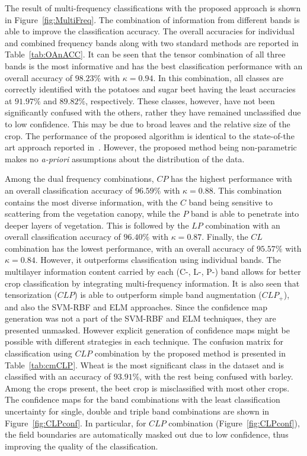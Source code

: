 The result of multi-frequency classifications with the proposed approach is shown in Figure~\ref{fig:MultiFreq}. The combination of information from different bands is able to improve the classification accuracy. The overall accuracies for individual and combined frequency bands along with two standard methods are reported in Table~\ref{tab:OAnACC}. 
It can be seen that the tensor combination of all three bands is the most informative and has the best classification performance with an overall accuracy of $98.23\%$ with $\kappa = 0.94$. In this combination, all classes are correctly identified with the potatoes and sugar beet having the least accuracies at $91.97\%$ and $89.82\%$, respectively. These classes, however, have not been significantly confused with the others, rather they have remained unclassified due to low confidence. This may be due to broad leaves and the relative size of the crop.
%
The performance of the proposed algorithm is identical to the state-of-the art approach reported in~\cite{7375754}. However, the proposed method being non-parametric makes no \textit{a-priori} assumptions about the distribution of the data. 


Among the dual frequency combinations,  $CP$ has the highest performance with an overall classification accuracy of $96.59\%$ with $\kappa = 0.88$. This combination contains the most diverse information, with the $C$ band being sensitive to scattering from the vegetation canopy, while the $P$ band is able to penetrate into deeper layers of vegetation. This is followed by the $LP$ combination with an overall classification accuracy of $96.40\%$ with $\kappa = 0.87$. Finally, the $CL$ combination has the lowest performance, with an overall accuracy of $95.57\%$ with $\kappa = 0.84$. However, it outperforms classification using individual bands. 
The multilayer information content carried by each (C-, L-, P-) band allows for better crop classification by integrating multi-frequency information. 
It is also seen that tensorization ($CLP$) is able to outperform simple band augmentation ($CLP_{+}$), and also the SVM-RBF and ELM approaches. Since the confidence map generation was not a part of the SVM-RBF and ELM techniques, they are presented unmasked. However explicit generation of confidence maps might be possible with different strategies in each technique.
The confusion matrix for classification using $CLP$ combination by the proposed method is presented in Table~\ref{tab:cmCLP}. Wheat is the most significant class in the dataset and is classified with an accuracy of $93.91\%$, with the rest being confused with barley. Among the crops present, the beet crop is misclassified with most other crops.
The confidence maps for the band combinations with the least classification uncertainty for single, double and triple band combinations are shown in Figure~\ref{fig:CLPconf}. In particular, for $CLP$ combination (Figure~\ref{fig:CLPconf}), the field boundaries are automatically masked out due to low confidence, thus improving the quality of the classification. 

